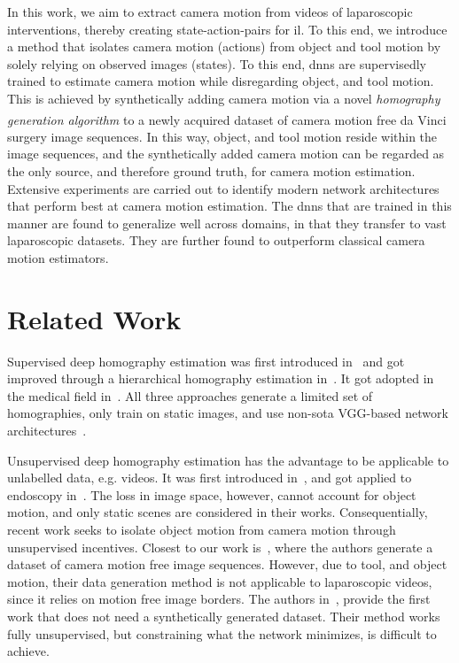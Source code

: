 In this work, we aim to extract camera motion from videos of laparoscopic interventions, thereby creating state-action-pairs for \gls{il}. To this end, we introduce a method that isolates camera motion (actions) from object and tool motion by solely relying on observed images (states). To this end, \gls{dnn}s are supervisedly trained to estimate camera motion while disregarding object, and tool motion. This is achieved by synthetically adding camera motion via a novel \textit{homography generation algorithm} to a newly acquired dataset of camera motion free da Vinci\textsuperscript{\textregistered} surgery image sequences. In this way, object, and tool motion reside within the image sequences, and the synthetically added camera motion can be regarded as the only source, and therefore ground truth, for camera motion estimation. Extensive experiments are carried out to identify modern network architectures that perform best at camera motion estimation. The \gls{dnn}s that are trained in this manner are found to generalize well across domains, in that they transfer to vast laparoscopic datasets. They are further found to outperform classical camera motion estimators.

\section{Related Work}

Supervised deep homography estimation was first introduced in~\cite{detone2016deep} and got improved through a hierarchical homography estimation in~\cite{erlik2017homography}. It got adopted in the medical field in~\cite{bano2020deep}. All three approaches generate a limited set of homographies, only train on static images, and use non-\gls{sota} VGG-based network architectures~\cite{simonyan2014very}.

Unsupervised deep homography estimation has the advantage to be applicable to unlabelled data, e.g. videos. It was first introduced in~\cite{nguyen2018unsupervised}, and got applied to endoscopy in~\cite{gomes2019unsupervised}. The loss in image space, however, cannot account for object motion, and only static scenes are considered in their works. Consequentially, recent work seeks to isolate object motion from camera motion through unsupervised incentives. Closest to our work is~\cite{le2020deep}, where the authors generate a dataset of camera motion free image sequences. However, due to tool, and object motion, their data generation method is not applicable to laparoscopic videos, since it relies on motion free image borders. The authors in~\cite{zhang2020content}, provide the first work that does not need a synthetically generated dataset. Their method works fully unsupervised, but constraining what the network minimizes, is difficult to achieve.

